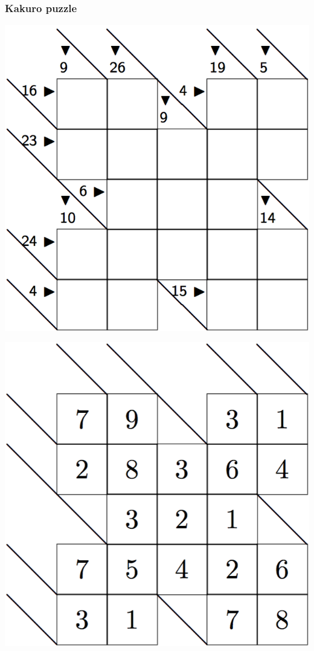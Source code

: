 \documentclass{beamer}
\begin{document}
\begin{frame}
  \frametitle{Kakuro puzzle}
  \begin{minipage}{0.45\textwidth}
    \includegraphics[scale=0.15]{kakuro.png}
  \end{minipage}
  \begin{minipage}{0.45\textwidth}
    \includegraphics[scale=0.15]{kakuro-sol.png}
  \end{minipage}


\end{frame}
\end{document}
